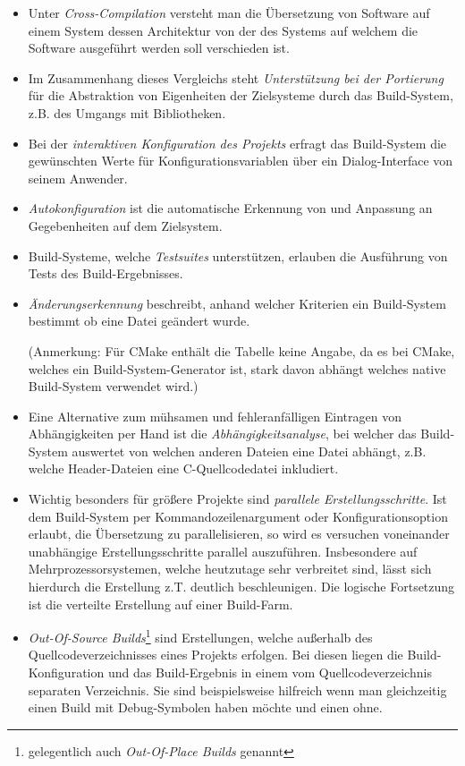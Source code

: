 \begin{itemize}
%
\item Unter \emph{Cross-Compilation} versteht man die Übersetzung von Software
auf einem System dessen Architektur von der des Systems auf welchem die Software
ausgeführt werden soll verschieden ist.
%
\item Im Zusammenhang dieses Vergleichs steht \emph{Unterstützung bei der
Portierung} für die Abstraktion von Eigenheiten der Zielsysteme durch das
Build-System, z.B. des Umgangs mit Bibliotheken.
%
\item Bei der \emph{interaktiven Konfiguration des Projekts} erfragt das
Build-System die gewünschten Werte für Konfigurationsvariablen über ein
Dialog-Interface von seinem Anwender.
%
\item \emph{Autokonfiguration} ist die automatische Erkennung von und Anpassung
an Gegebenheiten auf dem Zielsystem.
%
\item Build-Systeme, welche \emph{Testsuites} unterstützen, erlauben die
Ausführung von Tests des Build-Ergebnisses.
%
\item \emph{Änderungserkennung} beschreibt, anhand welcher Kriterien ein
Build-System bestimmt ob eine Datei geändert wurde.

(Anmerkung: Für CMake enthält die Tabelle keine Angabe, da es bei CMake, welches
ein Build-System-Generator ist, stark davon abhängt welches native Build-System
verwendet wird.)
%
\item Eine Alternative zum mühsamen und fehleranfälligen Eintragen von
Abhängigkeiten per Hand ist die \emph{Abhängigkeitsanalyse}, bei welcher das
Build-System auswertet von welchen anderen Dateien eine Datei abhängt, z.B.
welche Header-Dateien eine C-Quellcodedatei inkludiert.
%
\item Wichtig besonders für größere Projekte sind \emph{parallele
Erstellungsschritte}. Ist dem Build-System per Kommandozeilenargument oder
Konfigurationsoption erlaubt, die Übersetzung zu parallelisieren, so wird es
versuchen voneinander unabhängige Erstellungsschritte parallel auszuführen.
Insbesondere auf Mehrprozessorsystemen, welche heutzutage sehr verbreitet sind,
lässt sich hierdurch die Erstellung z.T. deutlich beschleunigen. Die logische
Fortsetzung ist die verteilte Erstellung auf einer Build-Farm.
%
\item \emph{Out-Of-Source Builds}\footnote{gelegentlich auch \emph{Out-Of-Place
Builds} genannt} sind Erstellungen, welche außerhalb des Quellcodeverzeichnisses
eines Projekts erfolgen. Bei diesen liegen die Build-Konfiguration und das
Build-Ergebnis in einem vom Quellcodeverzeichnis separaten Verzeichnis. Sie sind
beispielsweise hilfreich wenn man gleichzeitig einen Build mit Debug-Symbolen
haben möchte und einen ohne.
%
\end{itemize}


